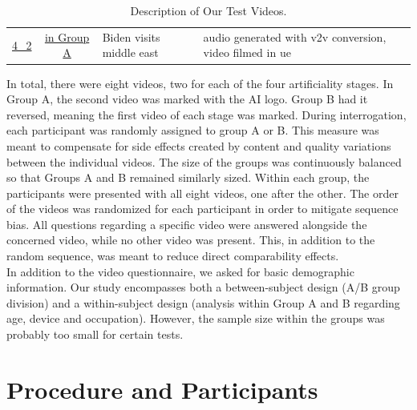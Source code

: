 \documentclass[
  a4paper,  %
  twoside,  %
  bibliography=totoc,
  headsepline,
  cleardoublepage=empty,
  parskip=half,
  draft=false
]{scrbook}
\begin{document}
\begin{table}[h]
\begin{tabularx}{\linewidth}{c|c|X|X}
    \midrule
    \href{https://drive.google.com/file/d/1yeodhLKDHi1-bNLv5yvDVSv8_8UBqZIp/view?usp=sharing}{4\_2} & \href{https://drive.google.com/file/d/1JG3i8yMdtDclLWBPKXPJuKSw1i81NdKC/view?usp=sharing}{in Group A} & Biden visits middle east  & audio generated with \gls{v2v} conversion, video filmed in \gls{ue} \\
  \end{tabularx}
  \caption{Description of Our Test Videos.}
  \label{tab:video-table}
\end{table}

In total, there were eight videos, two for each of the four artificiality stages. In Group A, the second video was marked with the AI logo. Group B had it reversed, meaning the first video of each stage was marked. During interrogation, each participant was randomly assigned to group A or B. This measure was meant to compensate for side effects created by content and quality variations between the individual videos. The size of the groups was continuously balanced so that Groups A and B remained similarly sized. Within each group, the participants were presented with all eight videos, one after the other. The order of the videos was randomized for each participant in order to mitigate sequence bias. All questions regarding a specific video were answered alongside the concerned video, while no other video was present. This, in addition to the random sequence, was meant to reduce direct comparability effects. \\
In addition to the video questionnaire, we asked for basic demographic information. Our study encompasses both a between-subject design (A/B group division) and a within-subject design (analysis within Group A and B regarding age, device and occupation). However, the sample size within the groups was probably too small for certain tests.

\section{Procedure and Participants}
\label{sec:procedure-and-participants}
\end{document}
